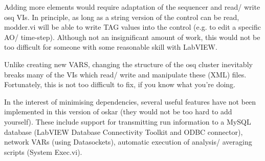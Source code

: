 \documentclass[10pt,a4paper]{article}
\newenvironment{warning}[1]{%
	\tcolorbox[beamer,%
	breakable,
	colback=white,colframe=DarkRed,%
	title=Warning:]}%
{\endtcolorbox}
\begin{document}
Adding more elements would require adaptation of the sequencer and read/ write osq VIs.  In principle, as long as a string version of the control can be read, modder.vi will be able to write TAG values into the control (e.g. to edit a specific AO/ time-step).  Although not an insignificant amount of work, this would not be too difficult for someone with some reasonable skill with LabVIEW.

\begin{warning}{}
	Unlike creating new VARS, changing the structure of the osq cluster inevitably breaks many of the VIs which read/ write and manipulate these (XML) files.  Fortunately, this is not too difficult to fix, if you know what you're doing.
\end{warning}

In the interest of minimising dependencies, several useful features have not been  implemented in this version of oskar (they would not be too hard to add yourself).  These include support for transmitting run information to a MySQL database (LabVIEW Database Connectivity Toolkit and ODBC connector), network VARs (using Datasockets), automatic execution of analysis/ averaging scripts (System Exec.vi).
\end{document}
